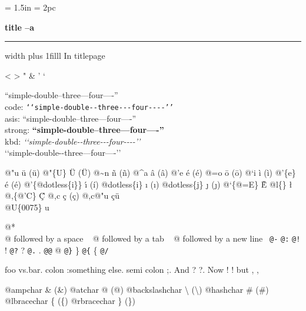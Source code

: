 \documentclass{book}
\newcommand\Texinfocommandstyletextkbd[1]{{\ttfamily\textsl{#1}}}%
\renewcommand{\_}{\Texinfounderscore\discretionary{}{}{}}
\begin{document}
\frontmatter
\begin{titlepage}
\begingroup
\newskip\titlepagetopglue \titlepagetopglue = 1.5in
\newskip\titlepagebottomglue \titlepagebottomglue = 2pc
\setlength{\parindent}{0pt}
    \vglue\titlepagetopglue
{\raggedright {\huge \bfseries title --a}}
\vskip 4pt \hrule height 4pt width \hsize \vskip 4pt
\vskip 0pt plus 1filll
%
%
In titlepage

<
>
"
\&
'
`

``simple-double--three---four----''\leavevmode{}\\
code: \texttt{{`}{`}simple-double{-}{-}three{-}{-}{-}four{-}{-}{-}-{'}{'}} \leavevmode{}\\
asis: ``simple-double--three---four----'' \leavevmode{}\\
strong: \textbf{``simple-double--three---four----''} \leavevmode{}\\
kbd: \Texinfocommandstyletextkbd{{`}{`}simple-double{-}{-}three{-}{-}{-}four{-}{-}{-}-{'}{'}} \leavevmode{}\\

`\hbox{}`simple-double-\hbox{}-three---four----'\hbox{}'\leavevmode{}\\

%
%
%
%

@"u \"{u} (ü)
@"\{U\} \"{U} (Ü) 
@\~{}n \~{n} (ñ)
@\^{}a \^{a} (â)
@'e \'{e} (é)
@=o \={o} (ō)
@`i \`{i} (ì)
@'\{e\} \'{e} (é)
@'\{@dotless\{i\}\} \'{\i{}} (í)
@dotless\{i\} \i{} (ı)
@dotless\{j\} \j{} (ȷ)
@`\{@=E\} \`{\={E}}
@l\{\} \l{}
@,\{@'C\} \c{\'{C}}
@,c \c{c} (ç)
@,c@"u \c{c}\"{u} \leavevmode{}\\

@U\{0075\} u

@* \leavevmode{}\\
@ followed by a space
\ {}
@ followed by a tab
\ {}
@ followed by a new line
\ {}\texttt{@-} \-{}
\texttt{@:} \@
\texttt{@!} \@!
\texttt{@?} \@?
\texttt{@.} \@.
\texttt{@@} @
\texttt{@\}} \}
\texttt{@\{} \{
\texttt{@/} 

foo vs.\@ bar. 
colon :\@And something else.
semi colon ;\@.
And ? ?\@.
Now ! !\@@
but , ,\@

@ampchar \& (\&)
@atchar @ (@)
@backslashchar \textbackslash{} (\textbackslash{})
@hashchar \# (\#)
@lbracechar \{ (\{)
@rbracechar \} (\})


\end{titlepage}
\end{document}
